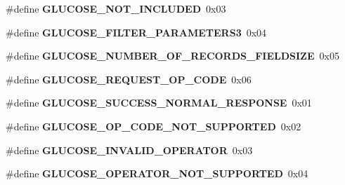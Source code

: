 \begin{DoxyCompactItemize}
\item 
\#define {\bfseries G\+L\+U\+C\+O\+S\+E\+\_\+\+N\+O\+T\+\_\+\+I\+N\+C\+L\+U\+D\+ED}~0x03\hypertarget{group___b_l_e___g_s_gab4efcb8935fbd0667125de1f81249d66}{}\label{group___b_l_e___g_s_gab4efcb8935fbd0667125de1f81249d66}

\item 
\#define {\bfseries G\+L\+U\+C\+O\+S\+E\+\_\+\+F\+I\+L\+T\+E\+R\+\_\+\+P\+A\+R\+A\+M\+E\+T\+E\+R\+S3}~0x04\hypertarget{group___b_l_e___g_s_gac31d3591fa138e7f482b94929e5b422d}{}\label{group___b_l_e___g_s_gac31d3591fa138e7f482b94929e5b422d}

\item 
\#define {\bfseries G\+L\+U\+C\+O\+S\+E\+\_\+\+N\+U\+M\+B\+E\+R\+\_\+\+O\+F\+\_\+\+R\+E\+C\+O\+R\+D\+S\+\_\+\+F\+I\+E\+L\+D\+S\+I\+ZE}~0x05\hypertarget{group___b_l_e___g_s_ga3043c8ad5219983bdcb6a0e6db9eb1e6}{}\label{group___b_l_e___g_s_ga3043c8ad5219983bdcb6a0e6db9eb1e6}

\item 
\#define {\bfseries G\+L\+U\+C\+O\+S\+E\+\_\+\+R\+E\+Q\+U\+E\+S\+T\+\_\+\+O\+P\+\_\+\+C\+O\+DE}~0x06\hypertarget{group___b_l_e___g_s_ga02cae4140b33e436b6f402c99d42d2b0}{}\label{group___b_l_e___g_s_ga02cae4140b33e436b6f402c99d42d2b0}

\item 
\#define {\bfseries G\+L\+U\+C\+O\+S\+E\+\_\+\+S\+U\+C\+C\+E\+S\+S\+\_\+\+N\+O\+R\+M\+A\+L\+\_\+\+R\+E\+S\+P\+O\+N\+SE}~0x01\hypertarget{group___b_l_e___g_s_gac7a157e13132613c6cf2444aca8941fd}{}\label{group___b_l_e___g_s_gac7a157e13132613c6cf2444aca8941fd}

\item 
\#define {\bfseries G\+L\+U\+C\+O\+S\+E\+\_\+\+O\+P\+\_\+\+C\+O\+D\+E\+\_\+\+N\+O\+T\+\_\+\+S\+U\+P\+P\+O\+R\+T\+ED}~0x02\hypertarget{group___b_l_e___g_s_gac0c68a09decd4d028bf28bcdc246124c}{}\label{group___b_l_e___g_s_gac0c68a09decd4d028bf28bcdc246124c}

\item 
\#define {\bfseries G\+L\+U\+C\+O\+S\+E\+\_\+\+I\+N\+V\+A\+L\+I\+D\+\_\+\+O\+P\+E\+R\+A\+T\+OR}~0x03\hypertarget{group___b_l_e___g_s_ga9150a4683591401061e1c54d96199a17}{}\label{group___b_l_e___g_s_ga9150a4683591401061e1c54d96199a17}

\item 
\#define {\bfseries G\+L\+U\+C\+O\+S\+E\+\_\+\+O\+P\+E\+R\+A\+T\+O\+R\+\_\+\+N\+O\+T\+\_\+\+S\+U\+P\+P\+O\+R\+T\+ED}~0x04\hypertarget{group___b_l_e___g_s_ga65514d6e4874be0847b2726c966e29c1}{}\label{group___b_l_e___g_s_ga65514d6e4874be0847b2726c966e29c1}


\end{DoxyCompactItemize}
